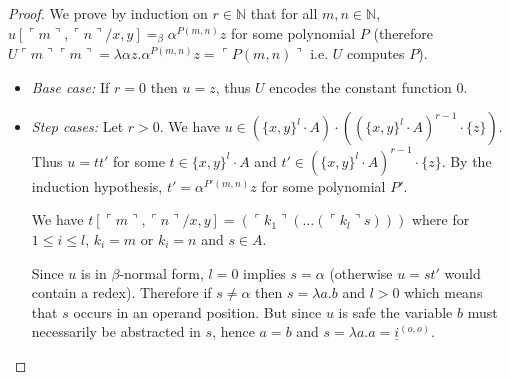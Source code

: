 \documentclass{article}
\newcommand{\encode}[1]{\ulcorner #1 \urcorner}
\newcommand{\nat}{\mathbb{N}}
\begin{document}
\begin{proof}
%
%

We prove by induction on $r \in \nat$ that for all $m,n \in\nat$, $u[\encode{m}, \encode{n}/x,y] =_\beta \alpha^{P(m,n)} z$ for some polynomial $P$ (therefore $U \encode{m} \encode{m}  = \lambda \alpha z . \alpha^{P(m,n)} z = \encode{P(m,n)}$ i.e. $U$ computes $P$).


\begin{itemize}

\item \emph{Base case:} If $r = 0$ then $u = z$, thus $U$ encodes the constant function $0$.

\item \emph{Step cases:} Let $r>0$. We have
 $u \in (\{ x, y\}^l \cdot A) \cdot \left( (\{ x, y\}^l \cdot A)^{r-1} \cdot \{ z \} \right)$. Thus $u = t t'$ for some $t \in \{ x, y\}^l \cdot A$ and $t' \in
(\{ x, y\}^l \cdot A)^{r-1} \cdot \{ z \}$. By the induction hypothesis, $t' = \alpha^{P'(m,n)} z$ for some polynomial $P'$.

We have $t[\encode{m}, \encode{n}/x,y] = (\encode{k_1} (\ldots (\encode{k_l} s)))$ where for $1 \leq i \leq l$, $k_i = m$ or $k_i = n$ and $s \in A$.

Since $u$ is in $\beta$-normal form, $l=0$ implies $s = \alpha$ 
(otherwise $u = s t'$ would contain a redex).
Therefore if $s \neq \alpha$ then $s=\lambda a . b$ and $l>0$ which means that $s$ occurs in an operand position. But since $u$ is safe the variable $b$ must necessarily be abstracted in $s$, hence $a=b$ and $s =  \lambda a . a = \underline{i}^{(o,o)}$.


\end{itemize}
\end{proof}
\end{document}
